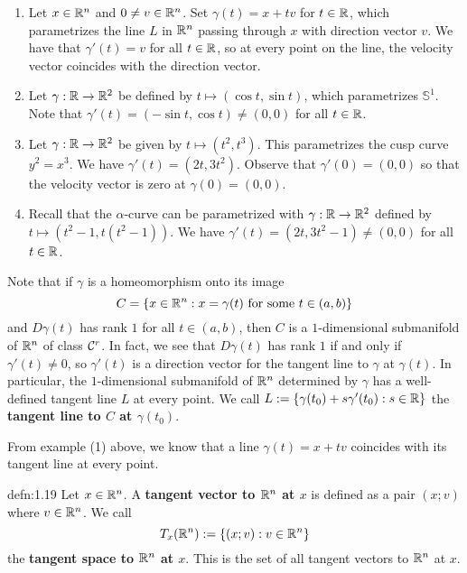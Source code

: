 \begin{enumerate}[(1)]
    \item Let $x \in \mathbb{R}^n$ and $0 \neq v \in \mathbb{R}^n$. Set $\gamma(t) = x + tv$ 
    for $t \in \mathbb{R}$, which parametrizes the line $L$ in $\mathbb{R}^n$ passing through 
    $x$ with direction vector $v$. We have that $\gamma'(t) = v$ for all 
    $t \in \mathbb{R}$, so at every point on the line, the velocity vector coincides 
    with the direction vector. 

    \item Let $\gamma : \mathbb{R} \to \mathbb{R}^2$ be defined by $t \mapsto (\cos t, \sin t)$, 
    which parametrizes $\mathbb{S}^1$. Note that $\gamma'(t) = 
    (-\sin t, \cos t) \neq (0, 0)$ for all $t \in \mathbb{R}$. 

    \item Let $\gamma : \mathbb{R} \to \mathbb{R}^2$ be given by $t \mapsto (t^2, t^3)$. 
    This parametrizes the cusp curve $y^2 = x^3$. We have $\gamma'(t) = (2t, 3t^2)$. 
    Observe that $\gamma'(0) = (0, 0)$ so that the velocity vector 
    is zero at $\gamma(0) = (0, 0)$. 

    \item Recall that the $\alpha$-curve can be parametrized with 
    $\gamma : \mathbb{R} \to \mathbb{R}^2$ defined by $t \mapsto (t^2-1, t(t^2-1))$. 
    We have $\gamma'(t) = (2t, 3t^2-1) \neq (0, 0)$ for all $t \in \mathbb{R}$. 
\end{enumerate}

Note that if $\gamma$ is a homeomorphism onto its image 
\[ C = \{x \in \mathbb{R}^n : x = \gamma(t) \text{ for some } t \in (a, b)\} \] 
and $D\gamma(t)$ has rank $1$ for all $t \in (a, b)$, then $C$ is a 
$1$-dimensional submanifold of $\mathbb{R}^n$ of class ${\cal C}^r$. In fact, we see that
$D\gamma(t)$ has rank $1$ if and only if $\gamma'(t) \neq 0$, so $\gamma'(t)$ 
is a direction vector for the tangent line to $\gamma$ at $\gamma(t)$. 
In particular, the $1$-dimensional submanifold of $\mathbb{R}^n$ determined by $\gamma$ 
has a well-defined tangent line $L$ at every point. We call 
$L := \{\gamma(t_0) + s\gamma'(t_0) : s \in \mathbb{R}\}$
the {\bf tangent line to $C$ at $\gamma(t_0)$}. 

From example (1) above, we know that a line $\gamma(t) = x + tv$ coincides 
with its tangent line at every point.

\begin{defn}{defn:1.19}
    Let $x \in \mathbb{R}^n$. A {\bf tangent vector to $\mathbb{R}^n$ at $x$} is defined as 
    a pair $(x; v)$ where $v \in \mathbb{R}^n$. We call 
    \[ T_x(\mathbb{R}^n) := \{(x; v) : v \in \mathbb{R}^n\} \] 
    the {\bf tangent space to $\mathbb{R}^n$ at $x$}. This is the set of all 
    tangent vectors to $\mathbb{R}^n$ at $x$. 
\end{defn}\vspace{-0.25cm}

